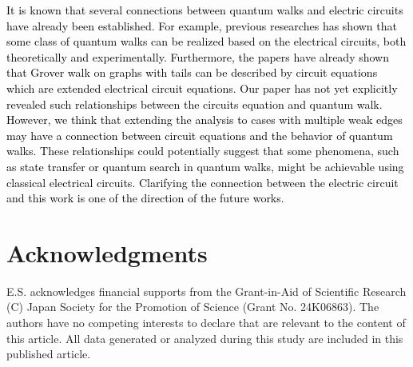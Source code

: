 \documentclass[12pt]{article}
\numberwithin{lemma}{section}
\numberwithin{proposition}{section}
\numberwithin{remark}{section}
\numberwithin{definition}{section}
\newcommand{\red}{\textcolor{black}}
\begin{document}
\red{
It is known that several connections between quantum walks and electric circuits have already been established. For example, previous researches \cite{Ecircuit, PCSZ} has shown that some class of quantum walks can be realized based on the electrical circuits, both theoretically and experimentally. Furthermore, the papers \cite{HSS1, HS2} have already shown that Grover walk on graphs with tails can be described by circuit equations which are extended electrical circuit equations. Our paper has not yet explicitly revealed such relationships between the circuits equation and quantum walk. However, we think that extending the analysis to cases with multiple weak edges may have a connection between circuit equations and the behavior of quantum walks. These relationships could potentially suggest that some phenomena, such as state transfer or quantum search in quantum walks, might be achievable using classical electrical circuits. Clarifying the connection between the electric circuit and this work is one of the direction of the future works.
}

\section*{Acknowledgments}
E.S. acknowledges financial supports from the Grant-in-Aid of Scientific Research (C) Japan Society for the Promotion of Science (Grant No. 24K06863).
The authors have no competing interests to declare that are relevant to the content of this article. All data generated or analyzed during this study are included in this published article.
% 


\end{document}
